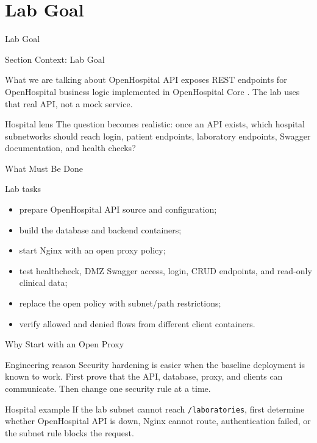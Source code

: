 \documentclass[presentation]{beamer}
\newcommand{\sectiontitleframe}[1]{
\begin{frame}[plain,c]
\begin{center}
{\usebeamerfont{title}\usebeamercolor[fg]{title}#1}
\end{center}
\end{frame}
}
\begin{document}
\section{Lab Goal}
\sectiontitleframe{Lab Goal}

\begin{frame}[c]{Section Context: Lab Goal}
\begin{block}{What we are talking about}
OpenHospital API exposes REST endpoints for OpenHospital business logic implemented in
OpenHospital Core \cite{openhospital_api}. The lab uses that real API, not a mock service.
\end{block}

\begin{exampleblock}{Hospital lens}
The question becomes realistic: once an API exists, which hospital subnetworks should reach login,
patient endpoints, laboratory endpoints, Swagger documentation, and health checks?
\end{exampleblock}
\end{frame}

\begin{frame}[c]{What Must Be Done}
\begin{block}{Lab tasks}
\begin{itemize}
    \item prepare OpenHospital API source and configuration;
    \item build the database and backend containers;
    \item start Nginx with an open proxy policy;
    \item test healthcheck, DMZ Swagger access, login, CRUD endpoints, and read-only clinical data;
    \item replace the open policy with subnet/path restrictions;
    \item verify allowed and denied flows from different client containers.
\end{itemize}
\end{block}
\end{frame}

\begin{frame}[c]{Why Start with an Open Proxy}
\begin{block}{Engineering reason}
Security hardening is easier when the baseline deployment is known to work. First prove that the
API, database, proxy, and clients can communicate. Then change one security rule at a time.
\end{block}

\begin{exampleblock}{Hospital example}
If the lab subnet cannot reach \texttt{/laboratories}, first determine whether OpenHospital API is
down, Nginx cannot route, authentication failed, or the subnet rule blocks the request.
\end{exampleblock}
\end{frame}
\end{document}
